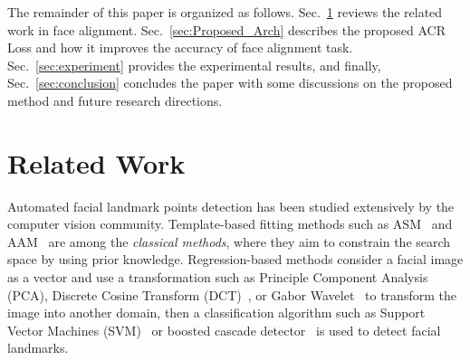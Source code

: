 \documentclass[a4paper,conference]{IEEEtran}
\begin{document}
The remainder of this paper is organized as follows. Sec.~\ref{sec:lit} reviews the related work in face alignment. Sec.~\ref{sec:Proposed_Arch} describes the proposed ACR Loss and how it improves the accuracy of face alignment task. Sec.~\ref{sec:experiment} provides the experimental results, and finally, Sec.~\ref{sec:conclusion} concludes the paper with some discussions on the proposed method and future research directions.  



\section{Related Work}\label{sec:lit}

Automated facial landmark points detection has been studied extensively by the computer vision community. Template-based fitting methods such as ASM~\cite{ordas2003active} and AAM~\cite{cootes2004statistical} are among the \textit{classical methods}, where they aim to constrain the search space by using prior knowledge. Regression-based methods consider a facial image as a vector and use a transformation such as Principle Component Analysis (PCA), Discrete Cosine Transform (DCT)~\cite{salah2007robust}, or Gabor Wavelet~\cite{arca2006face, vukadinovic2005fully} to transform the image into another domain, then a classification algorithm such as Support Vector Machines (SVM)~\cite{antonini2003independent, du2008svm} or boosted cascade detector~\cite{viola2001robust} is used to detect facial landmarks. 
\end{document}

